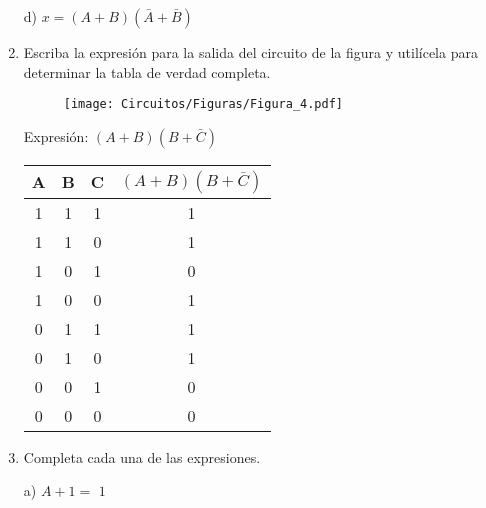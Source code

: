 \documentclass[a4paper, 12pt]{article}
\newcommand{\Aspace}{0.2cm}
\begin{document}
\begin{enumerate}
            \vspace{\Aspace} \par
            d) $x = (A + B)(\bar{A} + \bar{B})$
            \\ { \color{azul}  }



        \item Escriba la expresión para la salida del circuito de la figura y utilícela para determinar la tabla de verdad completa.
        \begin{figure}[!ht]
            \centering
            \texttt{[image: Circuitos/Figuras/Figura\_4.pdf]}
        \end{figure}
            \vspace{\Aspace} \par
            {   \color{azul} Expresión: $(A + B)(B + \bar{C})$ \par \vspace{0.5cm}
                \begin{tabular}{c|c|c|c}
                    \textbf{A}  &   \textbf{B}  &   \textbf{C}  &   $(A + B)(B + \bar{C})$      \\ \hline
                    1           &   1           &   1           &   1                           \\
                    1           &   1           &   0           &   1                           \\
                    1           &   0           &   1           &   0                           \\
                    1           &   0           &   0           &   1                           \\
                    0           &   1           &   1           &   1                           \\
                    0           &   1           &   0           &   1                           \\
                    0           &   0           &   1           &   0                           \\
                    0           &   0           &   0           &   0                           \\
                \end{tabular}
            }
        


        \item Completa cada una de las expresiones.
            \vspace{\Aspace} \par
            a) $A + 1 = $
            { \color{azul} $1$ }


\end{enumerate}
\end{document}
